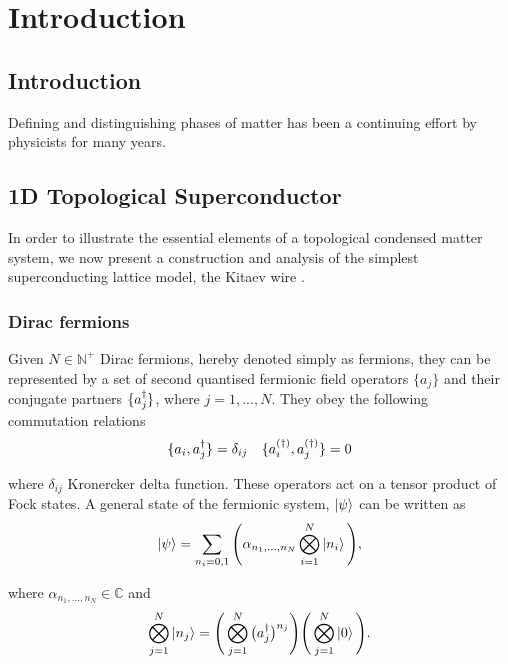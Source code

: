 \chapter{Introduction}

\ifpdf
    \graphicspath{{Chapter1/Chapter1Figs/PNG/}{Chapter1/Chapter1/PDF/}{Chapter1/Chapter1Figs/}}
\else
    \graphicspath{{Chapter1/Chapter1Figs/EPS/}{Chapter1/Chapter1/}}
\fi

\section{Introduction}

Defining and distinguishing phases of matter has been a continuing effort by physicists for many years. 

\section{1D Topological Superconductor}

In order to illustrate the essential elements of a topological condensed matter system, we now present a construction and analysis of the simplest superconducting lattice model, the Kitaev wire \cite{Kitaev01}. 

\subsection{Dirac fermions}

Given $N\in\mathbb{N}^{+}$ Dirac fermions, hereby denoted simply as fermions, they can be represented by a set of second quantised fermionic field operators $\{a_{j}\}$ and their conjugate partners $\{a_{j}^{\dagger}\}$, where $j=1,...,N$. They obey the following commutation relations
\begin{align}
    &\{a_{i},a_{j}^{\dagger}\}=\delta_{ij} &\{a_{i}^{(\dagger)},a_{j}^{(\dagger)}\}=0
\end{align}
    
\noi where $\delta_{ij}$ Kronercker delta function. These operators act on a tensor product of Fock states. A general state of the fermionic system, $\ket{\psi}$ can be written as
\begin{equation}
    \ket{\psi}=\sum_{n_{i}=0,1}\Bigg(\alpha_{n_{1},...,n_{N}}\bigotimes_{i=1}^{N}\ket{n_{i}}\Bigg),
\end{equation}

\noi where $\alpha_{n_{1},...,n_{N}}\in\mathbb{C}$ and
\begin{equation}
    \bigotimes_{j=1}^{N}\ket{n_{j}}=\Bigg(\bigotimes_{j=1}^{N}\big(a^{\dagger}_{j}\big)^{n_{j}}\Bigg)\Bigg(\bigotimes_{j=1}^{N}\ket{0}\Bigg).
\end{equation}

